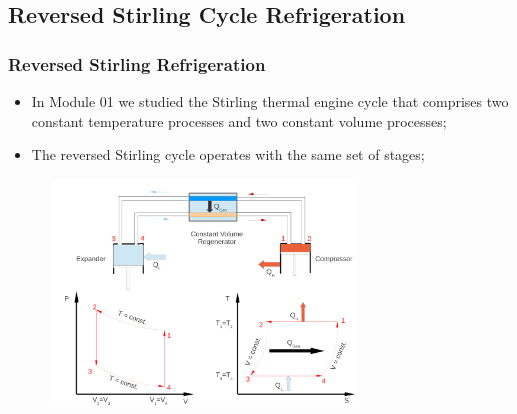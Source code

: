 \documentclass[10pt,compress]{beamer}
\begin{document}
\subsection{Reversed Stirling Cycle Refrigeration}
\begin{frame}
 \frametitle{Reversed Stirling Refrigeration}
  \begin{itemize}
   \item <1-> In Module 01 we studied the Stirling thermal engine cycle that comprises two constant temperature processes and two constant volume processes;
   \item <2-> The reversed Stirling cycle operates with the same set of stages;
  \end{itemize}

    \begin{figure}%
     \begin{center}
      \includegraphics[width=8.3cm,height=6.0cm]{./Pics/Overview_Refrig9}
     \end{center}
    \end{figure}  

\end{frame}
\end{document}
